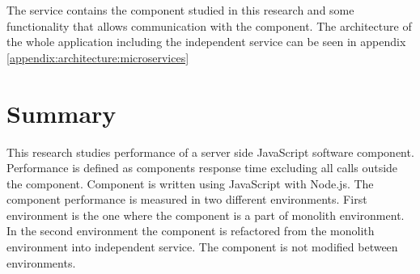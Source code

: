 The service contains the component studied in this research and some functionality that allows communication with the component.
The architecture of the whole application including the independent service can be seen in appendix \ref{appendix:architecture:microservices}

\section{Summary}
This research studies performance of a server side JavaScript software component.
Performance is defined as components response time excluding all calls outside the component.
Component is written using JavaScript with Node.js.
The component performance is measured in two different environments.
First environment is the one where the component is a part of monolith environment.
In the second environment the component is refactored from the monolith environment into independent service.
The component is not modified between environments.

